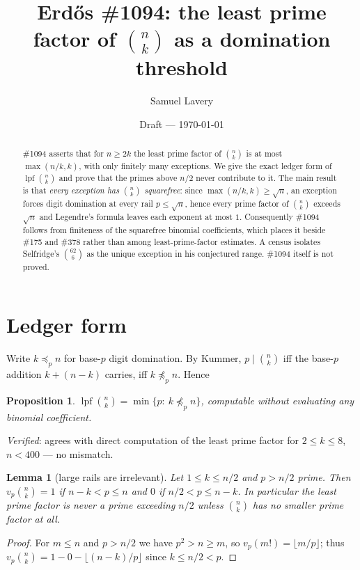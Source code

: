 \documentclass[11pt]{article}
\title{Erd\H{o}s \#1094: the least prime factor of $\binom nk$ as a domination threshold}
\author{Samuel Lavery}
\date{Draft --- \today}
\newtheorem{proposition}[theorem]{Proposition}
\newtheorem{lemma}[theorem]{Lemma}
\DeclareMathOperator{\lpf}{lpf}
\begin{document}
\maketitle

\begin{abstract}
\#1094 asserts that for $n\ge2k$ the least prime factor of $\binom nk$ is at most
$\max(n/k,k)$, with only finitely many exceptions.  We give the exact ledger form of
$\lpf\binom nk$ and prove that the primes above $n/2$ never contribute to it.  The main
result is that \emph{every exception has $\binom nk$ squarefree}: since
$\max(n/k,k)\ge\sqrt n$, an exception forces digit domination at every rail $p\le\sqrt n$,
hence every prime factor of $\binom nk$ exceeds $\sqrt n$ and Legendre's formula leaves each
exponent at most $1$.  Consequently \#1094 follows from finiteness of the squarefree binomial
coefficients, which places it beside \#175 and \#378 rather than among least-prime-factor
estimates.  A census isolates Selfridge's $\binom{62}{6}$ as the unique exception in his
conjectured range.  \#1094 itself is not proved.
\end{abstract}

\section{Ledger form}
Write $k\preceq_p n$ for base-$p$ digit domination.  By Kummer, $p\mid\binom nk$ iff the
base-$p$ addition $k+(n-k)$ carries, iff $k\not\preceq_p n$.  Hence

\begin{proposition}\label{prop:lpf}
$\displaystyle \lpf\binom nk=\min\{p:\ k\not\preceq_p n\}$, computable without evaluating
any binomial coefficient.
\end{proposition}

\emph{Verified}: agrees with direct computation of the least prime factor for $2\le k\le8$,
$n<400$ --- no mismatch.

\begin{lemma}[large rails are irrelevant]\label{lem:window}
Let $1\le k\le n/2$ and $p>n/2$ prime.  Then $v_p\binom nk=1$ if $n-k<p\le n$ and $0$ if
$n/2<p\le n-k$.  In particular the least prime factor is never a prime exceeding $n/2$
unless $\binom nk$ has no smaller prime factor at all.
\end{lemma}

\begin{proof}
For $m\le n$ and $p>n/2$ we have $p^2>n\ge m$, so $v_p(m!)=\lfloor m/p\rfloor$; thus
$v_p\binom nk=1-0-\lfloor(n-k)/p\rfloor$ since $k\le n/2<p$.
\end{proof}
\end{document}
